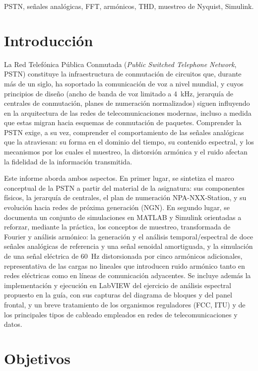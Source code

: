 \documentclass[conference]{IEEEtran}
\begin{document}
\begin{IEEEkeywords}
PSTN, señales analógicas, FFT, armónicos, THD, muestreo de Nyquist, Simulink.
\end{IEEEkeywords}

\section{Introducción}

La Red Telefónica Pública Conmutada (\textit{Public Switched Telephone Network}, PSTN) constituye la infraestructura de conmutación de circuitos que, durante más de un siglo, ha soportado la comunicación de voz a nivel mundial, y cuyos principios de diseño (ancho de banda de voz limitado a 4~kHz, jerarquía de centrales de conmutación, planes de numeración normalizados) siguen influyendo en la arquitectura de las redes de telecomunicaciones modernas, incluso a medida que estas migran hacia esquemas de conmutación de paquetes. Comprender la PSTN exige, a su vez, comprender el comportamiento de las señales analógicas que la atraviesan: su forma en el dominio del tiempo, su contenido espectral, y los mecanismos por los cuales el muestreo, la distorsión armónica y el ruido afectan la fidelidad de la información transmitida.

Este informe aborda ambos aspectos. En primer lugar, se sintetiza el marco conceptual de la PSTN a partir del material de la asignatura: sus componentes físicos, la jerarquía de centrales, el plan de numeración NPA-NXX-Station, y su evolución hacia redes de próxima generación (NGN). En segundo lugar, se documenta un conjunto de simulaciones en MATLAB y Simulink orientadas a reforzar, mediante la práctica, los conceptos de muestreo, transformada de Fourier y análisis armónico: la generación y el análisis temporal/espectral de doce señales analógicas de referencia y una señal senoidal amortiguada, y la simulación de una señal eléctrica de 60~Hz distorsionada por cinco armónicos adicionales, representativa de las cargas no lineales que introducen ruido armónico tanto en redes eléctricas como en líneas de comunicación adyacentes. Se incluye además la implementación y ejecución en LabVIEW del ejercicio de análisis espectral propuesto en la guía, con sus capturas del diagrama de bloques y del panel frontal, y un breve tratamiento de los organismos reguladores (FCC, ITU) y de los principales tipos de cableado empleados en redes de telecomunicaciones y datos.

\section{Objetivos}
\end{document}
